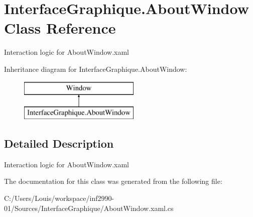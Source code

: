 \hypertarget{class_interface_graphique_1_1_about_window}{}\section{Interface\+Graphique.\+About\+Window Class Reference}
\label{class_interface_graphique_1_1_about_window}


Interaction logic for About\+Window.\+xaml  


Inheritance diagram for Interface\+Graphique.\+About\+Window\+:\begin{figure}[H]
\begin{center}
\leavevmode
\includegraphics[height=2.000000cm]{class_interface_graphique_1_1_about_window}
\end{center}
\end{figure}


\subsection{Detailed Description}
Interaction logic for About\+Window.\+xaml 



The documentation for this class was generated from the following file\+:\begin{DoxyCompactItemize}
\item 
C\+:/\+Users/\+Louis/workspace/inf2990-\/01/\+Sources/\+Interface\+Graphique/About\+Window.\+xaml.\+cs\end{DoxyCompactItemize}
